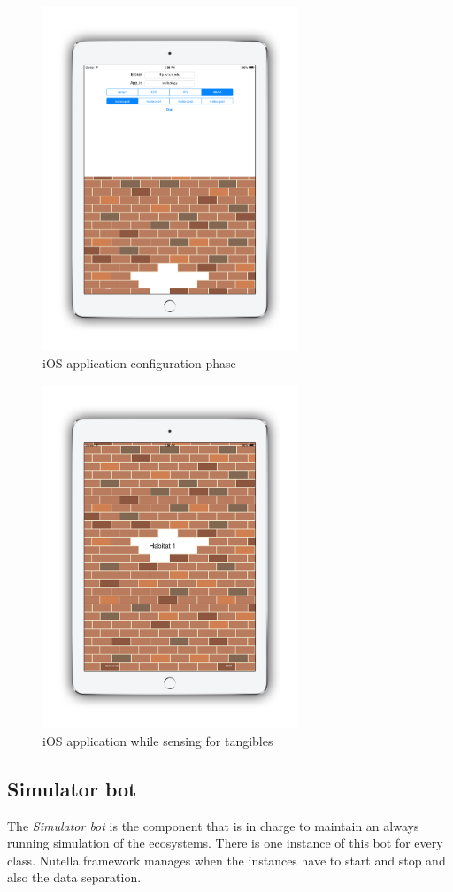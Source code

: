 \begin{figure}
\centering
\includegraphics[width=3in]{images/wallcology-ios.png}
\caption{iOS application configuration phase}
\label{fig:wallcology_ios_config}
\end{figure}

\begin{figure}
\centering
\includegraphics[width=3in]{images/wallcology-ios-sensing.png}
\caption{iOS application while sensing for tangibles}
\label{fig:wallcology_ios_config_sensing}
\end{figure}

\subsection{Simulator bot}
The \textit{Simulator bot} is the component that is in charge to maintain an always running simulation of the ecosystems. There is one instance of this bot for every class. Nutella framework manages when the instances have to start and stop and also the data separation.


